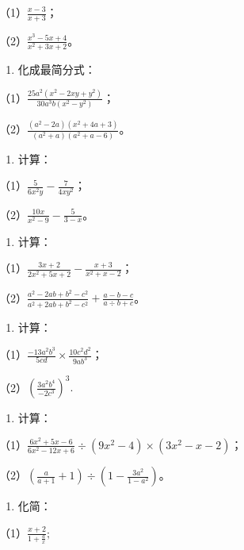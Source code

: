 （1）\(\frac{x - 3}{x + 3}\)；

（2）\(\frac{x^3 - 5x + 4}{x^2 + 3x + 2}\)。

\begin{enumerate}[start=3]
\item
  化成最简分式：
\end{enumerate}

（1）\(\frac{25a^2(x^2 - 2xy + y^2)}{30a^3b(x^2 - y^2)}\)；

（2）\(\frac{(a^2 - 2a)(x^2 + 4a + 3)}{(a^2 + a)(a^2 + a - 6)}\)。

\begin{enumerate}[start=4]
\item
  计算：
\end{enumerate}

（1）\(\frac{5}{6x^2y} - \frac{7}{4xy^2}\)；

（2）\(\frac{10x}{x^2 - 9} - \frac{5}{3 - x}\)。

\begin{enumerate}[start=5]
\item
  计算：
\end{enumerate}

（1）\(\frac{3x + 2}{2x^2 + 5x + 2} - \frac{x + 3}{x^2 + x - 2}\)；

（2）\(\frac{a^2 - 2ab + b^2 - c^2}{a^2 + 2ab + b^2 - c^2} + \frac{a - b - c}{a \div b + c}\)。

\begin{enumerate}[start=6]
\item
  计算：
\end{enumerate}

（1）\(\frac{-13a^2b^3}{5cd} \times \frac{10c^2d^2}{9ab^3}\)；

（2）\(\left(\frac{3a^2b^4}{-2c^3}\right)^3.\)

\begin{enumerate}[start=7]
\item
  计算：
\end{enumerate}

（1）\(\frac{6x^2 + 5x - 6}{6x^2 - 12x + 6} \div (9x^2 - 4) \times (3x^2 - x - 2)\)；

（2）\(\left(\frac{a}{a + 1} + 1\right) \div \left(1 - \frac{3a^2}{1 - a^2}\right)\)。

\begin{enumerate}[start=8]
\item
  化简：
\end{enumerate}

（1）\(\frac{x + 2}{1 + \frac{a}{x}};\)

